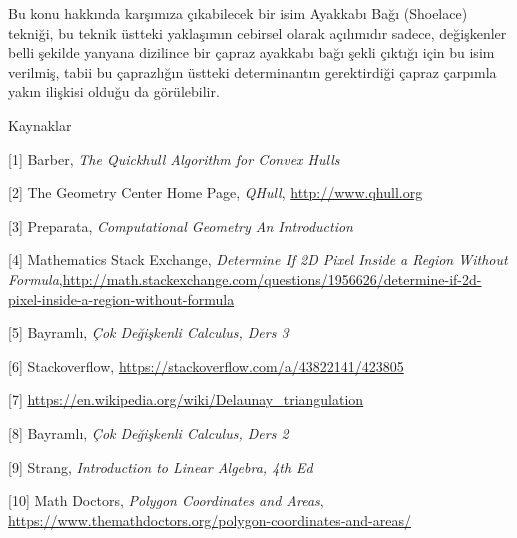 \documentclass[12pt,fleqn]{article}\usepackage{../../common}
\begin{document}
Bu konu hakkında karşımıza çıkabilecek bir isim Ayakkabı Bağı (Shoelace)
tekniği, bu teknik üstteki yaklaşımın cebirsel olarak açılımıdır sadece,
değişkenler belli şekilde yanyana dizilince bir çapraz ayakkabı bağı şekli
çıktığı için bu isim verilmiş, tabii bu çaprazlığın üstteki determinantın
gerektirdiği çapraz çarpımla yakın ilişkisi olduğu da görülebilir.

Kaynaklar 

[1] Barber, {\em The Quickhull Algorithm for Convex Hulls}

[2] The Geometry Center Home Page, {\em QHull}, \url{http://www.qhull.org}

[3] Preparata, {\em Computational Geometry An Introduction}

[4] Mathematics Stack Exchange, {\em Determine If 2D Pixel Inside a Region Without Formula},\url{http://math.stackexchange.com/questions/1956626/determine-if-2d-pixel-inside-a-region-without-formula}

[5] Bayramlı, {\em Çok Değişkenli Calculus, Ders 3}

[6] Stackoverflow, \url{https://stackoverflow.com/a/43822141/423805}

[7] \url{https://en.wikipedia.org/wiki/Delaunay_triangulation}

[8] Bayramlı, {\em Çok Değişkenli Calculus, Ders 2}

[9] Strang, {\em Introduction to Linear Algebra, 4th Ed}

[10] Math Doctors, {\em Polygon Coordinates and Areas},
     \url{https://www.themathdoctors.org/polygon-coordinates-and-areas/}
\end{document}
